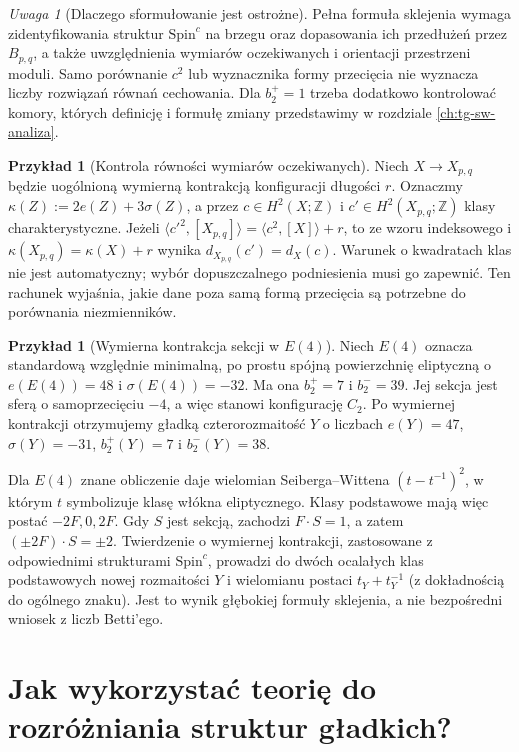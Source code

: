 \documentclass[11pt,a4paper]{report}
\numberwithin{equation}{section}
\theoremstyle{plain}
\theoremstyle{definition}
\newtheorem{przyklad}[twierdzenie]{Przykład}
\theoremstyle{remark}
\newtheorem{uwaga}[twierdzenie]{Uwaga}
\begin{document}
\begin{uwaga}[Dlaczego sformułowanie jest ostrożne]
Pełna formuła sklejenia wymaga zidentyfikowania struktur
$\mathrm{Spin}^c$ na brzegu oraz dopasowania ich przedłużeń
przez $B_{p,q}$, a także uwzględnienia wymiarów
oczekiwanych i orientacji przestrzeni moduli. Samo
porównanie $c^2$ lub wyznacznika formy przecięcia
nie wyznacza liczby rozwiązań równań cechowania.
Dla $b_2^+=1$ trzeba dodatkowo kontrolować komory,
których definicję i formułę zmiany przedstawimy w rozdziale
\ref{ch:tg-sw-analiza}.
\end{uwaga}

\begin{przyklad}[Kontrola równości wymiarów oczekiwanych]
Niech $X\to X_{p,q}$ będzie uogólnioną wymierną kontrakcją
konfiguracji długości $r$. Oznaczmy
$\kappa(Z):=2e(Z)+3\sigma(Z)$, a przez
$c\in H^2(X;\mathbb Z)$ i $c'\in H^2(X_{p,q};\mathbb Z)$
klasy charakterystyczne. Jeżeli
$\langle c'^2,[X_{p,q}]\rangle
=\langle c^2,[X]\rangle+r$, to ze wzoru indeksowego i
$\kappa(X_{p,q})=\kappa(X)+r$ wynika
$d_{X_{p,q}}(c')=d_X(c)$.
Warunek o kwadratach klas nie jest automatyczny;
wybór dopuszczalnego podniesienia musi go zapewnić.
Ten rachunek wyjaśnia, jakie dane poza samą formą
przecięcia są potrzebne do porównania niezmienników.
\end{przyklad}

\begin{przyklad}[Wymierna kontrakcja sekcji w $E(4)$]
Niech $E(4)$ oznacza standardową względnie minimalną,
po prostu spójną powierzchnię eliptyczną o
$e(E(4))=48$ i $\sigma(E(4))=-32$.
Ma ona $b_2^+=7$ i $b_2^-=39$.
Jej sekcja jest sferą o samoprzecięciu $-4$,
a więc stanowi konfigurację $C_2$. Po wymiernej
kontrakcji otrzymujemy gładką czterorozmaitość $Y$
o liczbach $e(Y)=47$, $\sigma(Y)=-31$,
$b_2^+(Y)=7$ i $b_2^-(Y)=38$.

Dla $E(4)$ znane obliczenie daje wielomian
Seiberga--Wittena $(t-t^{-1})^2$, w którym
$t$ symbolizuje klasę włókna eliptycznego.
Klasy podstawowe mają więc postać $-2F,0,2F$.
Gdy $S$ jest sekcją, zachodzi $F\cdot S=1$,
a zatem $(\pm2F)\cdot S=\pm2$.
Twierdzenie o wymiernej kontrakcji, zastosowane
z odpowiednimi strukturami $\mathrm{Spin}^c$,
prowadzi do dwóch ocalałych klas podstawowych
nowej rozmaitości $Y$ i wielomianu postaci
$t_Y+t_Y^{-1}$ (z dokładnością do ogólnego znaku).
Jest to wynik głębokiej formuły sklejenia, a nie
bezpośredni wniosek z liczb Betti'ego.
\end{przyklad}

\section{Jak wykorzystać teorię do rozróżniania struktur gładkich?}
\label{sec:tg-sw-exotic}
\end{document}
